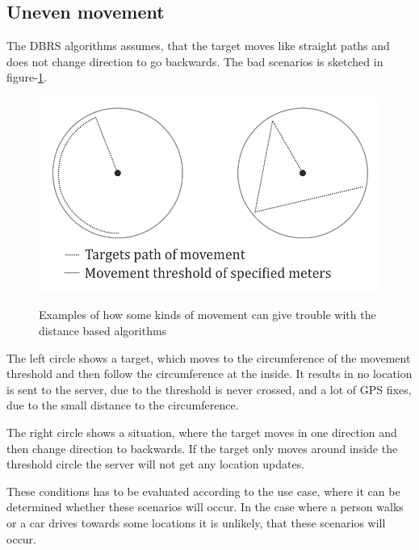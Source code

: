 \subsection{Uneven movement}
The DBRS algorithms assumes, that the target moves like straight paths and does not change direction to go backwards. The bad scenarios is sketched in figure-\ref{unevenmovement}.

\begin{figure}
\includegraphics{UnevenMovement}
\label{unevenmovement}
\caption{Examples of how some kinds of movement can give trouble with the distance based algorithms}
\end{figure}

The left circle shows a target, which moves to the circumference of the movement threshold and then follow the circumference at the inside. It results in no location is sent to the server, due to the threshold is never crossed, and a lot of GPS fixes, due to the small distance to the circumference.

The right circle shows a situation, where the target moves in one direction and then change direction to backwards. If the target only moves around inside the threshold circle the server will not get any location updates.

These conditions has to be evaluated according to the use case, where it can be determined whether these scenarios will occur. In the case where a person walks or a car drives towards some locations it is unlikely, that these scenarios will occur.